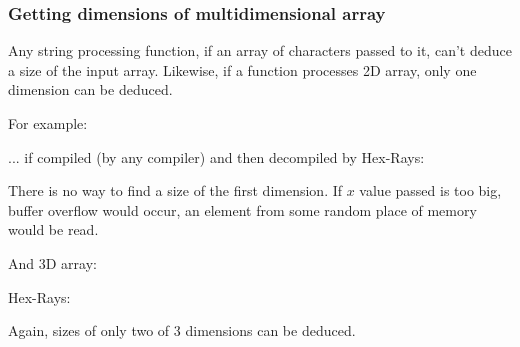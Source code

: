 \subsubsection{Getting dimensions of multidimensional array}

Any string processing function, if an array of characters passed to it, can't deduce a size of the input array.
Likewise, if a function processes 2D array, only one dimension can be deduced.

For example:



... if compiled (by any compiler) and then decompiled by Hex-Rays:



There is no way to find a size of the first dimension.
If $x$ value passed is too big, buffer overflow would occur, an element from some random place of memory would be read.

And 3D array:



Hex-Rays:



Again, sizes of only two of 3 dimensions can be deduced.

